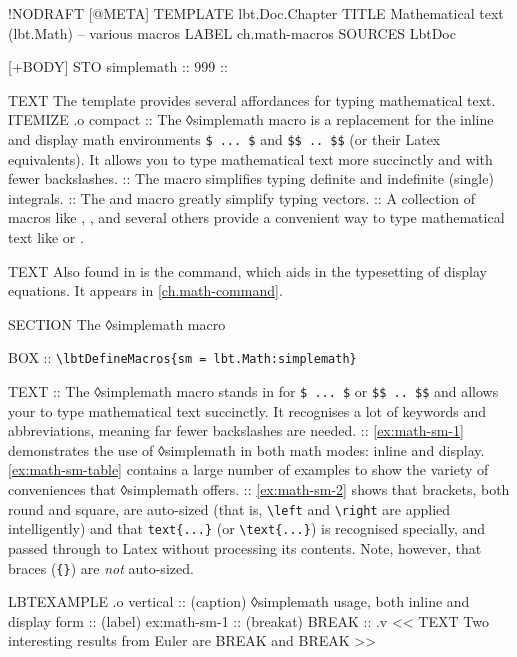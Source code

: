 \begin{lbt}
  !NODRAFT
  [@META]
    TEMPLATE lbt.Doc.Chapter
    TITLE Mathematical text \textsf{(lbt.Math)} -- various macros
    LABEL ch.math-macros
    SOURCES LbtDoc

  [+BODY]
    STO simplemath :: 999 :: 

    TEXT The  template provides several affordances for typing mathematical text.
    ITEMIZE .o compact
    :: The ◊simplemath macro is a replacement for the inline and display math environments \Verb|$ ... $| and \Verb|$$ .. $$| (or their Latex equivalents). It allows you to type mathematical text more succinctly and with fewer backslashes.
    :: The  macro simplifies typing definite and indefinite (single) integrals.
    :: The  and  macro greatly simplify typing vectors.
    :: A collection of macros like , ,  and several others provide a convenient way to type mathematical text like  or .

    TEXT Also found in  is the  command, which aids in the typesetting of display equations. It appears in \cref{ch.math-command}.

    SECTION The ◊simplemath macro

    BOX :: \verb|\lbtDefineMacros{sm = lbt.Math:simplemath}|

    TEXT
    :: The ◊simplemath macro stands in for \Verb|$ ... $| or \Verb|$$ .. $$| and allows your to type mathematical text succinctly. It recognises a lot of keywords and abbreviations, meaning far fewer backslashes are needed.
    :: \cref{ex:math-sm-1} demonstrates the use of ◊simplemath in both math modes: inline and display. \cref{ex:math-sm-table} contains a large number of examples to show the variety of conveniences that ◊simplemath offers.
    :: \cref{ex:math-sm-2} shows that brackets, both round and square, are auto-sized (that is, \Verb|\left| and \Verb|\right| are applied intelligently) and that \Verb|text{...}| (or \Verb|\text{...}|) is recognised specially, and passed through to Latex without processing its contents. Note, however, that braces (\Verb|{}|) are \emph{not} auto-sized.

    LBTEXAMPLE .o vertical
    :: (caption) ◊simplemath usage, both inline and display form
    :: (label) ex:math-sm-1
    :: (breakat) BREAK
    :: .v <<
      TEXT Two interesting results from Euler are BREAK  and BREAK 
    >>


\end{lbt}

